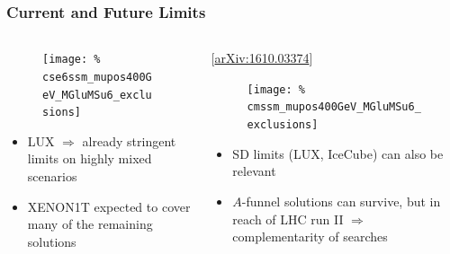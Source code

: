 \documentclass[10pt,aspectratio=169]{beamer}
\begin{document}
\begin{frame}
  \frametitle{Current and Future Limits}
  \begin{columns}[t]
    \begin{column}{0.5\textwidth}
      \vspace{-12pt}
      \begin{figure}
        \texttt{[image: \%
          cse6ssm\_mupos400GeV\_MGluMSu6\_exclusions]}
      \end{figure}
      \vspace*{-8pt}
      \begin{itemize}\itemsep1em
        \item {\color{red} LUX $\Rightarrow$ already stringent limits
          on highly mixed scenarios}
        \item XENON1T expected to cover many of the remaining
          solutions
      \end{itemize}
    \end{column}
    \begin{column}{0.5\textwidth}
      \vspace{-24pt}
      \begin{center}
        \tiny [\href{https://arxiv.org/abs/1610.03374}{arXiv:1610.03374}]
      \end{center}
      \vspace{-12pt}
      \begin{figure}
        \texttt{[image: \%
          cmssm\_mupos400GeV\_MGluMSu6\_exclusions]}
      \end{figure}
      \vspace*{-8pt}
      \begin{itemize}\itemsep1em
        \item SD limits (LUX, IceCube) can also be relevant
        \item $A$-funnel solutions can survive, but in reach of
          LHC run II $\Rightarrow$ {\color{blue}
            complementarity of searches}
      \end{itemize}
    \end{column}
  \end{columns}
\end{frame}
\end{document}
